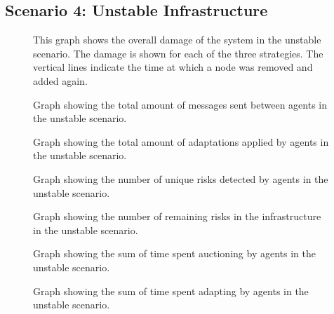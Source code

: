 \subsection{Scenario 4: Unstable Infrastructure}
\begin{figure}[H]
    \centering
    
    \caption{This graph shows the overall damage of the system in the unstable scenario. The damage is shown for each of the three strategies. The vertical lines indicate the time at which a node was removed and added again.}
    \label{fig:overall-damage-unstable}
\end{figure}

\begin{figure}[H]
    \centering
    
    \caption{Graph showing the total amount of messages sent between agents in the unstable scenario.}
\end{figure}
\begin{figure}[H]
    \centering
    
    \caption{Graph showing the total amount of adaptations applied by agents in the unstable scenario.}
\end{figure}
\begin{figure}[H]
    \centering
        
    \caption{Graph showing the number of unique risks detected by agents in the unstable scenario.}
\end{figure}
\begin{figure}[H]
    \centering
        
    \caption{Graph showing the number of remaining risks in the infrastructure in the unstable scenario.}
\end{figure}
\begin{figure}[H]
    \centering
        
    \caption{Graph showing the sum of time spent auctioning by agents in the unstable scenario.}
\end{figure}
\begin{figure}[H]
    \centering
        
    \caption{Graph showing the sum of time spent adapting by agents in the unstable scenario.}
\end{figure}
